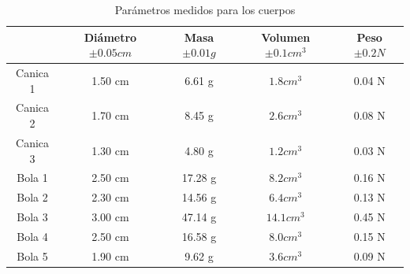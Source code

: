 \documentclass{article}
\begin{document}
\renewcommand{\tablename}{Tabla de datos}
\begin{table}[h]
\centering
\begin{tabular}{|c||c|c|c|c|}
\hline
 &  Diámetro $\pm 0.05 cm$ & Masa $\pm 0.01 g$ & Volumen $\pm0.1cm^3$ & Peso $\pm 0.2 N$ \\ \hline \hline
Canica 1 & 1.50 cm & 6.61 g & $1.8 cm^3$ & 0.04 N\\ \hline
Canica 2 & 1.70 cm & 8.45 g & $2.6 cm^3$ & 0.08 N \\ \hline
Canica 3 & 1.30 cm & 4.80 g & $1.2 cm^3$ & 0.03 N \\ \hline
Bola 1 & 2.50 cm & 17.28 g & $8.2cm^3$ & 0.16 N \\ \hline
Bola 2 & 2.30 cm & 14.56 g & $6.4cm^3$ & 0.13 N \\ \hline
Bola 3 & 3.00 cm & 47.14 g & $14.1cm^3$ & 0.45 N \\ \hline
Bola 4 & 2.50 cm & 16.58 g & $8.0cm^3$ & 0.15 N \\ \hline
Bola 5 & 1.90 cm & 9.62 g & $3.6cm^3$ & 0.09 N \\ \hline
\end{tabular}
\caption{Parámetros medidos para los cuerpos}
\end{table} \par
\end{document}
